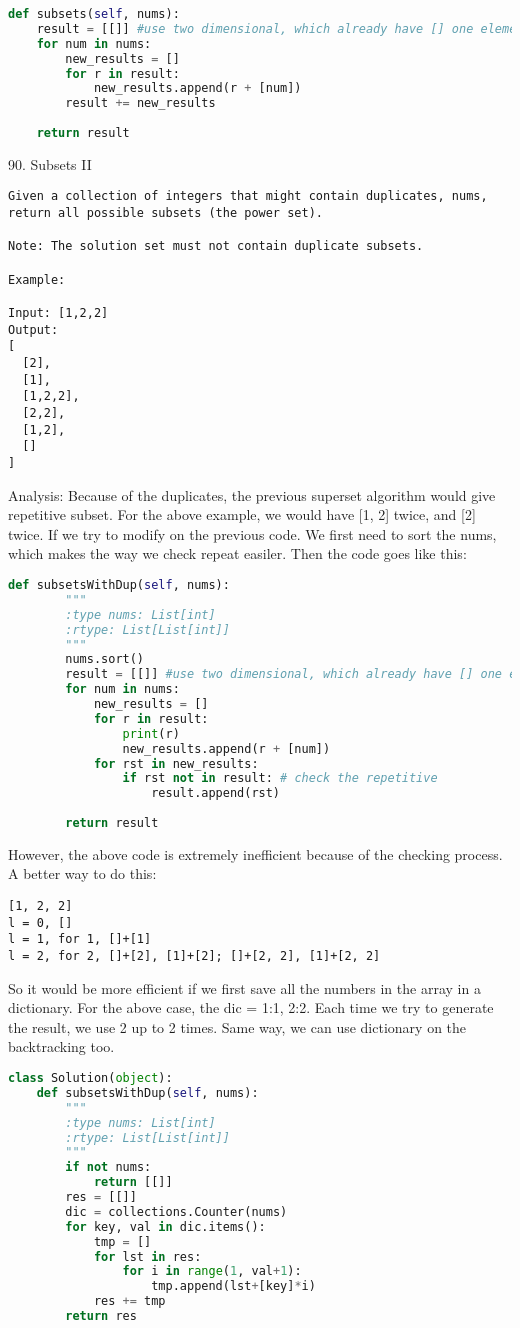 \documentclass[../main.tex]{subfiles}
\begin{document}
\begin{lstlisting}[language=Python]
def subsets(self, nums):
    result = [[]] #use two dimensional, which already have [] one element
    for num in nums:
        new_results = []
        for r in result:
            new_results.append(r + [num])
        result += new_results
        
    return result
\end{lstlisting}
90. Subsets II
\begin{lstlisting}
Given a collection of integers that might contain duplicates, nums, return all possible subsets (the power set).

Note: The solution set must not contain duplicate subsets.

Example:

Input: [1,2,2]
Output:
[
  [2],
  [1],
  [1,2,2],
  [2,2],
  [1,2],
  []
]
\end{lstlisting}
Analysis: Because of the duplicates, the previous superset algorithm would give repetitive subset. For the above example, we would have [1, 2] twice, and [2] twice.  If we try to modify on the previous code. We first need to sort the nums, which makes the way we check repeat easiler. Then the code goes like this:
\begin{lstlisting}[language = Python]
    def subsetsWithDup(self, nums):
        """
        :type nums: List[int]
        :rtype: List[List[int]]
        """
        nums.sort()
        result = [[]] #use two dimensional, which already have [] one element
        for num in nums:
            new_results = []
            for r in result:
                print(r)
                new_results.append(r + [num])
            for rst in new_results:
                if rst not in result: # check the repetitive
                    result.append(rst)
            
        return result
\end{lstlisting}
However, the above code is extremely inefficient because of the checking process. A better way to do this:
\begin{lstlisting}
[1, 2, 2]
l = 0, []
l = 1, for 1, []+[1]
l = 2, for 2, []+[2], [1]+[2]; []+[2, 2], [1]+[2, 2]
\end{lstlisting}
So it would be more efficient if we first save all the numbers in the array in a dictionary. For the above case, the dic = {1:1, 2:2}. Each time we try to generate the result, we use 2 up to 2 times. Same way, we can use dictionary on the backtracking too. 
\begin{lstlisting}[language=Python]
class Solution(object):
    def subsetsWithDup(self, nums):
        """
        :type nums: List[int]
        :rtype: List[List[int]]
        """
        if not nums:
            return [[]]
        res = [[]]
        dic = collections.Counter(nums)
        for key, val in dic.items():
            tmp = []
            for lst in res:
                for i in range(1, val+1):
                    tmp.append(lst+[key]*i)
            res += tmp
        return res
\end{lstlisting}
\end{document}

